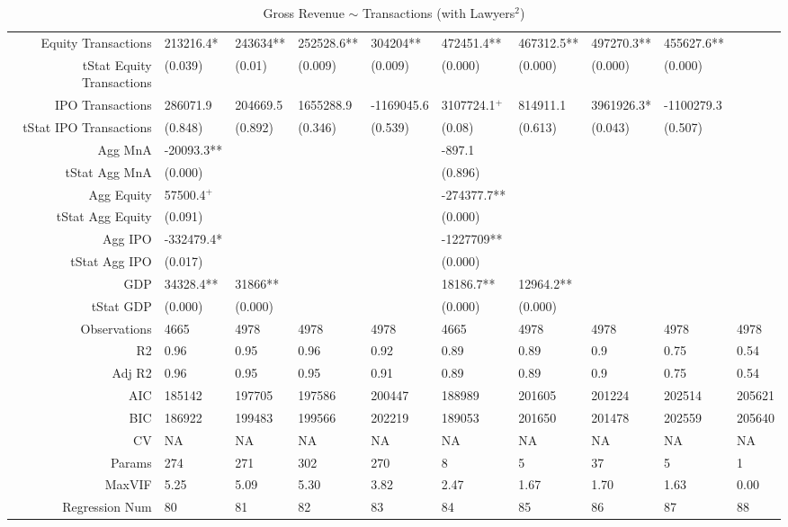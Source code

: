 \begin{table}[ht]
\begin{tabular}{rlllllllll}
  Equity Transactions & 213216.4* & 243634** & 252528.6** & 304204** & 472451.4** & 467312.5** & 497270.3** & 455627.6** &  \\ 
  tStat Equity Transactions & (0.039) & (0.01) & (0.009) & (0.009) & (0.000) & (0.000) & (0.000) & (0.000) &  \\ 
  IPO Transactions & 286071.9 & 204669.5 & 1655288.9 & -1169045.6 & 3107724.1$^{+}$ & 814911.1 & 3961926.3* & -1100279.3 &  \\ 
  tStat IPO Transactions & (0.848) & (0.892) & (0.346) & (0.539) & (0.08) & (0.613) & (0.043) & (0.507) &  \\ 
  Agg MnA & -20093.3** &  &  &  & -897.1 &  &  &  &  \\ 
  tStat Agg MnA & (0.000) &  &  &  & (0.896) &  &  &  &  \\ 
  Agg Equity & 57500.4$^{+}$ &  &  &  & -274377.7** &  &  &  &  \\ 
  tStat Agg Equity & (0.091) &  &  &  & (0.000) &  &  &  &  \\ 
  Agg IPO & -332479.4* &  &  &  & -1227709** &  &  &  &  \\ 
  tStat Agg IPO & (0.017) &  &  &  & (0.000) &  &  &  &  \\ 
  GDP & 34328.4** & 31866** &  &  & 18186.7** & 12964.2** &  &  &  \\ 
  tStat GDP & (0.000) & (0.000) &  &  & (0.000) & (0.000) &  &  &  \\ 
  Observations & 4665 & 4978 & 4978 & 4978 & 4665 & 4978 & 4978 & 4978 & 4978 \\ 
  R2 & 0.96 & 0.95 & 0.96 & 0.92 & 0.89 & 0.89 & 0.9 & 0.75 & 0.54 \\ 
  Adj R2 & 0.96 & 0.95 & 0.95 & 0.91 & 0.89 & 0.89 & 0.9 & 0.75 & 0.54 \\ 
  AIC & 185142 & 197705 & 197586 & 200447 & 188989 & 201605 & 201224 & 202514 & 205621 \\ 
  BIC & 186922 & 199483 & 199566 & 202219 & 189053 & 201650 & 201478 & 202559 & 205640 \\ 
  CV & NA & NA & NA & NA & NA & NA & NA & NA & NA \\ 
  Params & 274 & 271 & 302 & 270 & 8 & 5 & 37 & 5 & 1 \\ 
  MaxVIF & 5.25 & 5.09 & 5.30 & 3.82 & 2.47 & 1.67 & 1.70 & 1.63 & 0.00 \\ 
  Regression Num & 80 & 81 & 82 & 83 & 84 & 85 & 86 & 87 & 88 \\ 
   \hline
\end{tabular}
\caption{Gross Revenue $\sim$ Transactions (with Lawyers$^2$)} 
\end{table}
